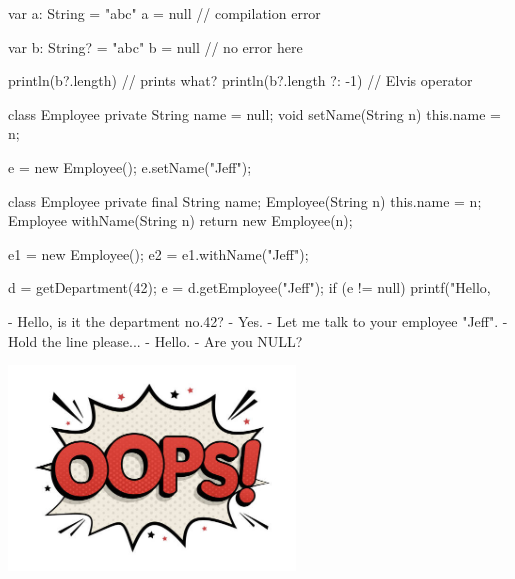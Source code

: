 \documentclass{article}
\begin{document}
{\small\begin{ffcode}
var a: String = "abc"
a = null // compilation error

var b: String? = "abc"
b = null // no error here

println(b?.length) // prints what?
println(b?.length ?: -1) // Elvis operator
\end{ffcode}
}
\plush{}


\begin{pptWide}{2}
{\small\begin{ffcode}
class Employee {
  private String name = null;
  void setName(String n) {
    this.name = n;
  }
}

e = new Employee();
e.setName("Jeff");
\end{ffcode}
}
\par\columnbreak\par
{\small\begin{ffcode}
class Employee {
  private final String name;
  Employee(String n) {
    this.name = n;
  }
  Employee withName(String n) {
    return new Employee(n);
  }
}

e1 = new Employee();
e2 = e1.withName("Jeff");
\end{ffcode}
}
\end{pptWide}
\plush{}


\begin{pptWide}{2}
{\small\begin{ffcode}
d = getDepartment(42);
e = d.getEmployee("Jeff");
if (e != null) {
  printf("Hello, %
}
\end{ffcode}
}
\par\columnbreak\par
{\small\begin{ffcode}
- Hello, is it the department no.42?
- Yes.
- Let me talk to your employee "Jeff".
- Hold the line please...
- Hello.
- Are you NULL?
\end{ffcode}
}
\includegraphics[width=3in]{oops.jpg}
\end{pptWide}
\par
\plush{}
\end{document}
